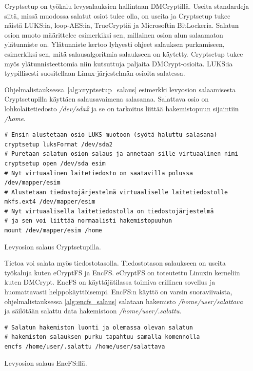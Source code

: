 Cryptsetup on työkalu levysalauksien hallintaan DMCryptillä. Useita standardeja siitä, missä muodossa salatut osiot tulee olla, on useita ja Cryptsetup tukee näistä LUKS:ia, loop-AES:ia, TrueCryptiä ja Microsoftin BitLockeria. Salatun osion muoto määrittelee esimerkiksi sen, millainen osion alun salaamaton ylätunniste on. Ylätunniste kertoo lyhyesti ohjeet salauksen purkamiseen, esimerkiksi sen, mitä salausalgoritmia salaukseen on käytetty. Cryptsetup tukee myös ylätunnisteettomia niin kutsuttuja paljaita DMCrypt-osioita. LUKS:ia tyypillisesti suositellaan Linux-järjestelmän osioita salatessa.

Ohjelmalistauksessa~\ref{alg:cryptsetup_salaus} esimerkki levyosion salaamisesta Cryptsetupilla käyttäen salausavaimena salasanaa. Salattava osio on lohkolaitetiedosto \textit{/dev/sda2} ja se on tarkoitus liittää hakemistopuun sijaintiin \textit{/home}.~\cite{cryptsetup}

\begin{algorithm}[tbh]
\begin{verbatim}
# Ensin alustetaan osio LUKS-muotoon (syötä haluttu salasana)
cryptsetup luksFormat /dev/sda2
# Puretaan salatun osion salaus ja annetaan sille virtuaalinen nimi
cryptsetup open /dev/sda esim
# Nyt virtuaalinen laitetiedosto on saatavilla polussa /dev/mapper/esim
# Alustetaan tiedostojärjestelmä virtuaaliselle laitetiedostolle
mkfs.ext4 /dev/mapper/esim
# Nyt virtuaalisella laitetiedostolla on tiedostojärjestelmä
# ja sen voi liittää normaalisti hakemistopuuhun
mount /dev/mapper/esim /home
\end{verbatim}
\caption{Levyosion salaus Cryptsetupilla.\label{alg:cryptsetup_salaus}}
\end{algorithm}
\newpage{}

Tietoa voi salata myös tiedostotasolla. Tiedostotason salaukseen on useita työkaluja kuten eCryptFS ja EncFS. eCryptFS on toteutettu Linuxin kerneliin kuten DMCrypt. EncFS on käyttäjätilassa toimiva erillinen sovellus ja huomattavasti helppokäyttöisempi. EncFS:n käyttö on varsin suoraviivaista, ohjelmalistauksessa \ref{alg:encfs_salaus} salataan hakemisto \textit{/home/user/salattava} ja säilötään salattu data hakemistoon \textit{/home/user/.salattu}.~\cite{encfs}

\begin{algorithm}[tbh]
\begin{verbatim}
# Salatun hakemiston luonti ja olemassa olevan salatun
# hakemiston salauksen purku tapahtuu samalla komennolla
encfs /home/user/.salattu /home/user/salattava
\end{verbatim}
\caption{Levyosion salaus EncFS:llä.\label{alg:encfs_salaus}}
\end{algorithm}
\newpage{}

